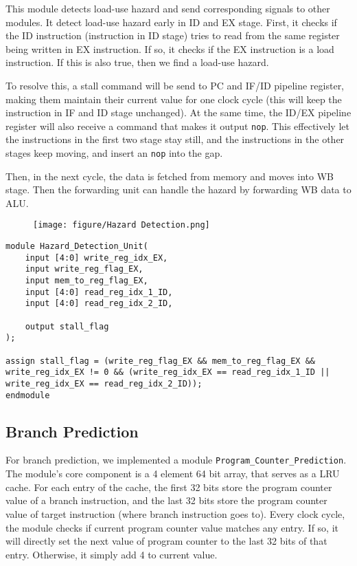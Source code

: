 \documentclass[a4paper,12pt]{article}
\begin{document}
This module detects load-use hazard and send corresponding signals to other modules. It detect load-use hazard early in ID and EX stage. First, it checks if the ID instruction (instruction in ID stage) tries to read from the same register being written in EX instruction. If so, it checks if the EX instruction is a load instruction. If this is also true, then we find a load-use hazard.

To resolve this, a stall command will be send to PC and IF/ID pipeline register, making them maintain their current value for one clock cycle (this will keep the instruction in IF and ID stage unchanged). At the same time, the ID/EX pipeline register will also receive a command that makes it output \texttt{nop}. This effectively let the instructions in the first two stage stay still, and the instructions in the other stages keep moving, and insert an \texttt{nop} into the gap.

Then, in the next cycle, the data is fetched from memory and moves into WB stage. Then the forwarding unit can handle the hazard by forwarding WB data to ALU.

\begin{figure}[H]
    \centering
    \texttt{[image: figure/Hazard Detection.png]}
\end{figure}

\begin{verbatim}
module Hazard_Detection_Unit(
    input [4:0] write_reg_idx_EX,
    input write_reg_flag_EX,
    input mem_to_reg_flag_EX,
    input [4:0] read_reg_idx_1_ID,
    input [4:0] read_reg_idx_2_ID,

    output stall_flag
);

assign stall_flag = (write_reg_flag_EX && mem_to_reg_flag_EX && write_reg_idx_EX != 0 && (write_reg_idx_EX == read_reg_idx_1_ID || write_reg_idx_EX == read_reg_idx_2_ID));
endmodule

\end{verbatim}

\subsection{Branch Prediction}

For branch prediction, we implemented a module \texttt{Program\_Counter\_Prediction}. The module's core component is a 4 element 64 bit array, that serves as a LRU cache. For each entry of the cache, the first 32 bits store the program counter value of a branch instruction, and the last 32 bits store the program counter value of target instruction (where branch instruction goes to). Every clock cycle, the module checks if current program counter value matches any entry. If so, it will directly set the next value of program counter to the last 32 bits of that entry. Otherwise, it simply add 4 to current value.
\end{document}
